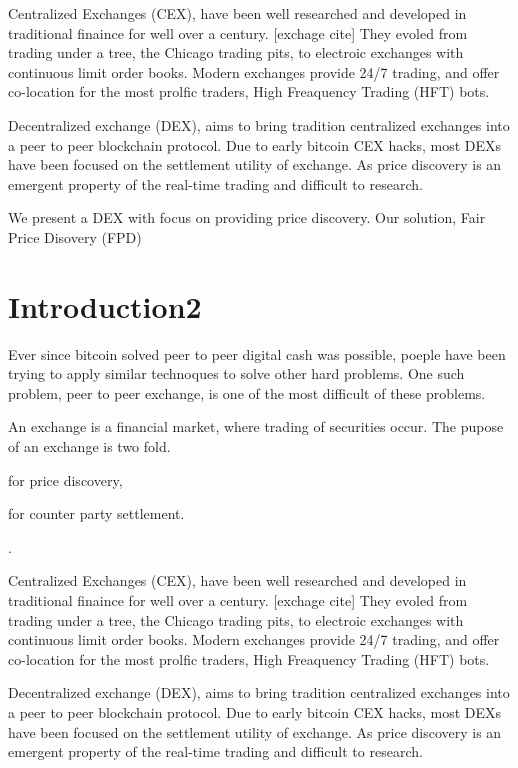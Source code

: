 \documentclass[12pt]{article}
\begin{document}
Centralized Exchanges (CEX), have been well researched and developed in traditional finaince for well over a century. [exchage cite] They  evoled from trading under a tree, the Chicago trading pits, to electroic exchanges with continuous limit order books. Modern exchanges provide 24/7 trading, and offer co-location for the most prolfic traders, High Freaquency Trading (HFT) bots. 

Decentralized exchange (DEX), aims to bring tradition centralized exchanges into a peer to peer blockchain protocol. Due to early bitcoin CEX hacks, most DEXs have been focused on the settlement utility of exchange. As price discovery is an emergent property of the real-time trading and difficult to research. 

We present a DEX with focus on providing price discovery. Our solution, Fair Price Disovery (FPD) 



\section{Introduction2}
Ever since bitcoin solved peer to peer digital cash was possible, poeple have been trying to apply similar technoques to solve other hard problems. One such problem, peer to peer exchange, is one of the most difficult of these problems. 

An exchange is a financial market, where trading of securities occur. The pupose of an exchange is two fold. \begin {enumerate*} [1) ]%
\item for price discovery, \item for counter party settlement. \end {enumerate*}. 

Centralized Exchanges (CEX), have been well researched and developed in traditional finaince for well over a century. [exchage cite] They  evoled from trading under a tree, the Chicago trading pits, to electroic exchanges with continuous limit order books. Modern exchanges provide 24/7 trading, and offer co-location for the most prolfic traders, High Freaquency Trading (HFT) bots. 

Decentralized exchange (DEX), aims to bring tradition centralized exchanges into a peer to peer blockchain protocol. Due to early bitcoin CEX hacks, most DEXs have been focused on the settlement utility of exchange. As price discovery is an emergent property of the real-time trading and difficult to research. 
\end{document}
